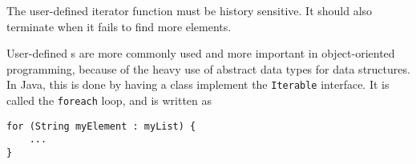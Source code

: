 The user-defined iterator function must be history sensitive.
It should also terminate when it fails to find more elements.

User-defined s are more commonly used and more important in object-oriented programming, because of the heavy use of abstract data types for data structures.
In Java, this is done by having a class implement the \texttt{Iterable} interface.
It is called the \texttt{foreach} loop, and is written as
\begin{verbatim}
for (String myElement : myList) {
    ...
}
\end{verbatim}

